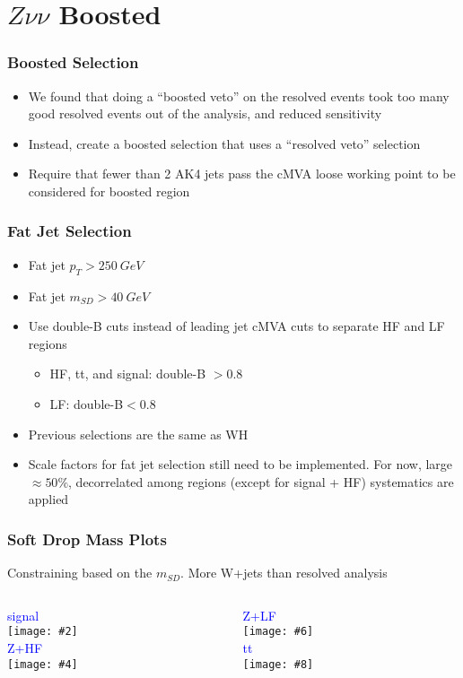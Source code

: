 \documentclass{beamer}
\newcommand{\fourfigs}[8]{
  \begin{columns}
    \begin{column}{0.3\linewidth}
      \centering
      \textcolor{blue}{#1} \\
      \texttt{[image: \#2]} \\
      \textcolor{blue}{#3} \\
      \texttt{[image: \#4]}
    \end{column}
    \begin{column}{0.3\linewidth}
      \centering
      \textcolor{blue}{#5} \\
      \texttt{[image: \#6]} \\
      \textcolor{blue}{#7} \\
      \texttt{[image: \#8]}
    \end{column}
  \end{columns}
}
\begin{document}
\section{$Z\nu\nu$ Boosted}

\begin{frame}
  \frametitle{Boosted Selection}
  \begin{itemize}
  \item We found that doing a ``boosted veto'' on the resolved events took too many
    good resolved events out of the analysis, and reduced sensitivity
  \item Instead, create a boosted selection that uses a ``resolved veto'' selection
  \item Require that fewer than 2 AK4 jets pass the cMVA loose working point to be considered
    for boosted region
  \end{itemize}
\end{frame}

\begin{frame}
  \frametitle{Fat Jet Selection}
  \begin{itemize}
  \item Fat jet $p_T > \SI{250}{GeV}$
  \item Fat jet $m_{SD} > \SI{40}{GeV}$
  \item Use double-B cuts instead of leading jet cMVA cuts to separate HF and LF regions
    \begin{itemize}
    \item HF, tt, and signal: double-B $> 0.8$
    \item LF: double-B$< 0.8$
    \end{itemize}
  \item Previous selections are the same as WH
  \item Scale factors for fat jet selection still need to be implemented.
    For now, large $\approx 50\%$, decorrelated among regions (except for signal + HF)
    systematics are applied
  \end{itemize}
\end{frame}

\begin{frame}
  \frametitle{Soft Drop Mass Plots}
  Constraining based on the $m_{SD}$. More W+jets than resolved analysis

  \fourfigs{signal}
           {180327_v4/boosted_signal_fatjet1_mSD_corr}
           {Z+HF}
           {180327_v4/boosted_heavyz_fatjet1_mSD_corr}
           {Z+LF}
           {180327_v4/boosted_lightz_fatjet1_mSD_corr}
           {tt}
           {180327_v4/boosted_tt_fatjet1_mSD_corr}
\end{frame}
\end{document}
